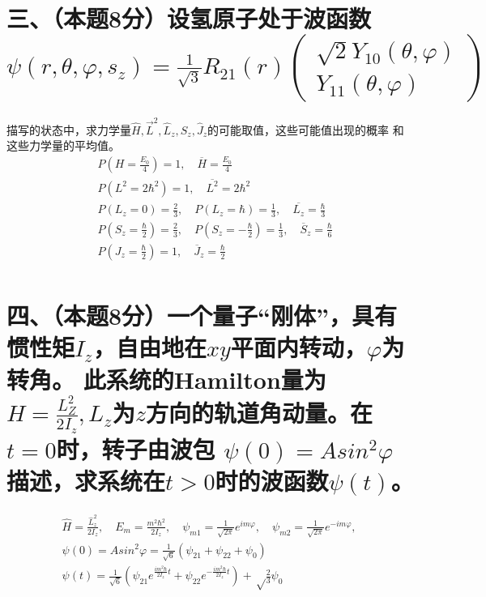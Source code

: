 \documentclass[UTF8]{ctexart}
\begin{document}
\section*{三、（本题8分）设氢原子处于波函数$\psi(r,\theta,\varphi,s_z)=\frac{1}{\sqrt3}R_{21}(r)
  \begin{pmatrix}\sqrt2Y_{10}(\theta,\varphi)\\ Y_{11}(\theta,\varphi)\end{pmatrix}$}
描写的状态中，求力学量$\hat H,\vec L^2,\hat L_z,\hat S_z,\hat J_z$的可能取值，这些可能值出现的概率
和这些力学量的平均值。
\begin{equation*}
  \begin{aligned}
     & P(H=\frac{E_0}{4})=1,\quad\overline{H}=\frac{E_0}{4}                               \\
     & P(L^2=2\hbar^2)=1,\quad\overline{L^2}=2\hbar^2                                     \\
     & P(L_z=0)=\frac{2}{3},\quad P(L_z=\hbar)=\frac{1}{3},\quad
    \overline{L_z}=\frac{\hbar}{3}                                                        \\
     & P(S_z=\frac{\hbar}{2})=\frac{2}{3},\quad P(S_z=-\frac{\hbar}{2})=\frac{1}{3},\quad
    \overline S_z=\frac{\hbar}{6}                                                         \\
     & P(J_z=\frac{\hbar}{2})=1,\quad\overline J_z=\frac{\hbar}{2}                        \\
  \end{aligned}
\end{equation*}
\section*{四、（本题8分）一个量子“刚体”，具有惯性矩$I_z$，自由地在$xy$平面内转动，$\varphi$为转角。
  此系统的Hamilton量为$H=\frac{L_Z^2}{2I_z},L_z$为$z$方向的轨道角动量。在$t=0$时，转子由波包
  $\psi(0)=Asin^2\varphi$描述，求系统在$t>0$时的波函数$\psi(t)$。}
\begin{equation*}
  \begin{aligned}
     & \hat H=\frac{\hat L_z^2}{2I_z},\quad E_m=\frac{m^2\hbar^2}{2I_z},\quad
    \psi_{m1}=\frac{1}{\sqrt{2\pi}}e^{im\varphi},\quad
    \psi_{m2}=\frac{1}{\sqrt{2\pi}}e^{-im\varphi},\quad                       \\
     & \psi(0)=Asin^2\varphi=\frac{1}{\sqrt6}(\psi_{21}+\psi_{22}+\psi_0)     \\
     & \psi(t)=\frac{1}{\sqrt6}(\psi_{21}e^{\frac{im^2\hbar}{2I_z}t}
    +\psi_{22}e^{-\frac{im^2\hbar}{2I_z}t})+\sqrt\frac{2}{3}\psi_0
  \end{aligned}
\end{equation*}
\end{document}
